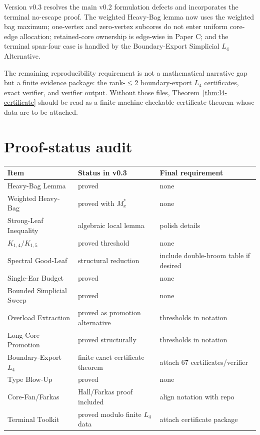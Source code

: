 \documentclass[11pt]{article}
\theoremstyle{definition}
\begin{document}
Version v0.3 resolves the main v0.2 formulation defects and incorporates the terminal no-escape proof. The weighted Heavy-Bag lemma now uses the weighted bag maximum; one-vertex and zero-vertex subcores do not enter uniform core-edge allocation; retained-core ownership is edge-wise in Paper C; and the terminal span-four case is handled by the Boundary-Export Simplicial \(L_4\) Alternative.

The remaining reproducibility requirement is not a mathematical narrative gap but a finite evidence package: the rank-\(\le2\) boundary-export \(L_4\) certificates, exact verifier, and verifier output. Without those files, Theorem~\ref{thm:l4-certificate} should be read as a finite machine-checkable certificate theorem whose data are to be attached.

\section{Proof-status audit}

\begin{center}
\begin{tabular}{lll}
\toprule
Item & Status in v0.3 & Final requirement\\
\midrule
Heavy-Bag Lemma & proved & none\\
Weighted Heavy-Bag & proved with \(M_x^*\) & none\\
Strong-Leaf Inequality & algebraic local lemma & polish details\\
\(K_{1,4}/K_{1,5}\) & proved threshold & none\\
Spectral Good-Leaf & structural reduction & include double-broom table if desired\\
Single-Ear Budget & proved & none\\
Bounded Simplicial Sweep & proved & none\\
Overload Extraction & proved as promotion alternative & thresholds in notation\\
Long-Core Promotion & proved structurally & thresholds in notation\\
Boundary-Export \(L_4\) & finite exact certificate theorem & attach 67 certificates/verifier\\
Type Blow-Up & proved & none\\
Core-Fan/Farkas & Hall/Farkas proof included & align notation with repo\\
Terminal Toolkit & proved modulo finite \(L_4\) data & attach certificate package\\
\bottomrule
\end{tabular}
\end{center}
\end{document}
